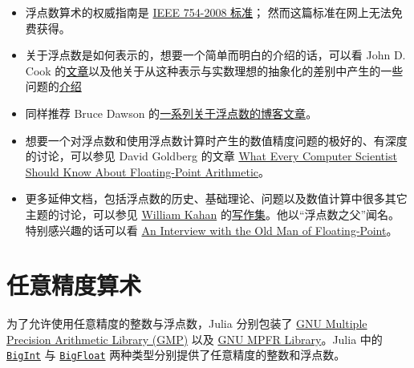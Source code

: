 \begin{itemize}
\item 浮点数算术的权威指南是 \href{https://standards.ieee.org/standard/754-2008.html}{IEEE 754-2008 标准}； 然而这篇标准在网上无法免费获得。


\item 关于浮点数是如何表示的，想要一个简单而明白的介绍的话，可以看 John D. Cook 的\href{https://www.johndcook.com/blog/2009/04/06/anatomy-of-a-floating-point-number/}{文章}以及他关于从这种表示与实数理想的抽象化的差别中产生的一些问题的\href{https://www.johndcook.com/blog/2009/04/06/numbers-are-a-leaky-abstraction/}{介绍}


\item 同样推荐 Bruce Dawson 的\href{https://randomascii.wordpress.com/2012/05/20/thats-not-normalthe-performance-of-odd-floats}{一系列关于浮点数的博客文章}。


\item 想要一个对浮点数和使用浮点数计算时产生的数值精度问题的极好的、有深度的讨论，可以参见 David Goldberg 的文章 \href{http://citeseerx.ist.psu.edu/viewdoc/download?doi=10.1.1.22.6768\&rep=rep1\&type=pdf}{What Every Computer Scientist Should Know About Floating-Point Arithmetic}。


\item 更多延伸文档，包括浮点数的历史、基础理论、问题以及数值计算中很多其它主题的讨论，可以参见 \href{https://en.wikipedia.org/wiki/William\_Kahan}{William Kahan} 的\href{https://people.eecs.berkeley.edu/{\textasciitilde}wkahan/}{写作集}。他以“浮点数之父”闻名。特别感兴趣的话可以看 \href{https://people.eecs.berkeley.edu/{\textasciitilde}wkahan/ieee754status/754story.html}{An Interview with the Old Man of Floating-Point}。

\end{itemize}


\hypertarget{5997763766467609329}{}


\section{任意精度算术}



为了允许使用任意精度的整数与浮点数，Julia 分别包装了 \href{https://gmplib.org}{GNU Multiple Precision Arithmetic Library (GMP)} 以及 \href{https://www.mpfr.org}{GNU MPFR Library}。Julia 中的 \hyperlink{423405808990690832}{\texttt{BigInt}} 与 \hyperlink{749816618809421837}{\texttt{BigFloat}} 两种类型分别提供了任意精度的整数和浮点数。



